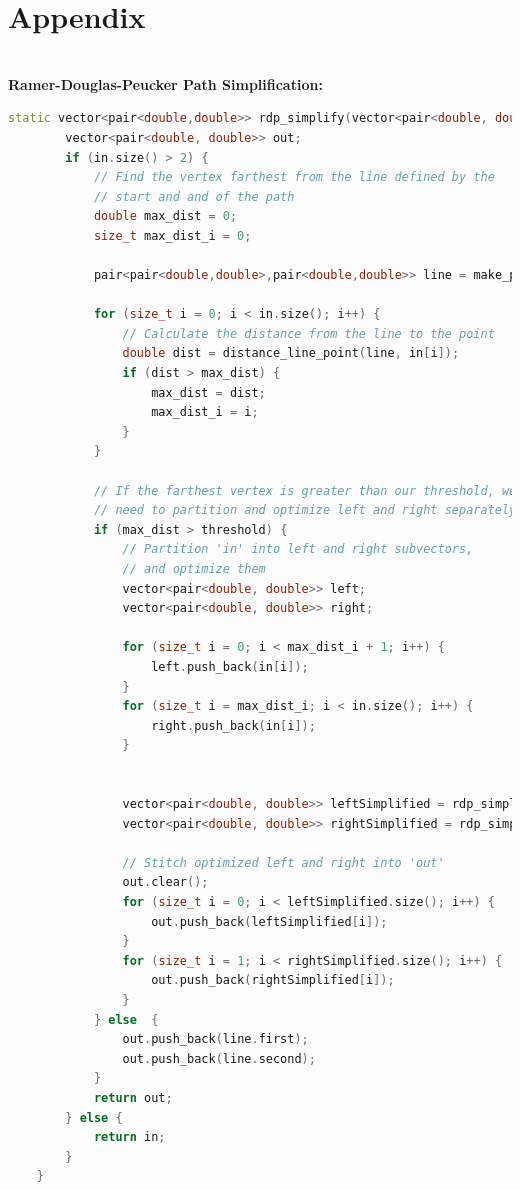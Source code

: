 \documentclass[titlepage,12pt,a4paper]{article}
\begin{document}
\pagebreak

\section*{Appendix}

\textbf{\\Ramer-Douglas-Peucker Path Simplification: \\}
\begin{lstlisting}[language=C++]
	static vector<pair<double,double>> rdp_simplify(vector<pair<double, double>> in, double threshold) {
        vector<pair<double, double>> out;
        if (in.size() > 2) {
            // Find the vertex farthest from the line defined by the
            // start and and of the path
            double max_dist = 0;
            size_t max_dist_i = 0;      

            pair<pair<double,double>,pair<double,double>> line = make_pair(in.front(), in.back());
    
            for (size_t i = 0; i < in.size(); i++) {
            	// Calculate the distance from the line to the point
                double dist = distance_line_point(line, in[i]);
                if (dist > max_dist) {
                    max_dist = dist;
                    max_dist_i = i;
                }
            }

            // If the farthest vertex is greater than our threshold, we
            // need to partition and optimize left and right separately
            if (max_dist > threshold) {
                // Partition 'in' into left and right subvectors,
                // and optimize them
                vector<pair<double, double>> left;
                vector<pair<double, double>> right;
                
                for (size_t i = 0; i < max_dist_i + 1; i++) {
                    left.push_back(in[i]);
                }
                for (size_t i = max_dist_i; i < in.size(); i++) { 
                    right.push_back(in[i]);
                }
	
	
                vector<pair<double, double>> leftSimplified = rdp_simplify(left, threshold);
                vector<pair<double, double>> rightSimplified = rdp_simplify(right, threshold);

                // Stitch optimized left and right into 'out'
                out.clear();
                for (size_t i = 0; i < leftSimplified.size(); i++) {
                    out.push_back(leftSimplified[i]);
                }
                for (size_t i = 1; i < rightSimplified.size(); i++) {
                    out.push_back(rightSimplified[i]);
                }
            } else  {
                out.push_back(line.first);
                out.push_back(line.second);
            }
            return out;
        } else {
            return in;
        }
    }    
\end{lstlisting}
\end{document}
